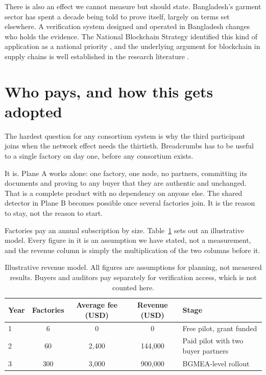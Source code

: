 \documentclass[11pt,a4paper]{article}
\begin{document}
There is also an effect we cannot measure but should state. Bangladesh's garment
sector has spent a decade being told to prove itself, largely on terms set
elsewhere. A verification system designed and operated in Bangladesh changes who
holds the evidence. The National Blockchain Strategy identified this kind of
application as a national priority \citep{ictd2020blockchain}, and the
underlying argument for blockchain in supply chains is well established in the
research literature \citep{saberi2019blockchain,kshetri2018blockchain}.

\section{Who pays, and how this gets adopted}

The hardest question for any consortium system is why the third participant
joins when the network effect needs the thirtieth. Breadcrumbs has to be useful
to a single factory on day one, before any consortium exists.

It is. Plane A works alone: one factory, one node, no partners, committing its
documents and proving to any buyer that they are authentic and unchanged. That
is a complete product with no dependency on anyone else. The shared detector in
Plane B becomes possible once several factories join. It is the reason to stay,
not the reason to start.

Factories pay an annual subscription by size. Table~\ref{tab:money} sets out an
illustrative model. Every figure in it is an assumption we have stated, not a
measurement, and the revenue column is simply the multiplication of the two
columns before it.

\begin{table}[htbp]
\centering
\caption{Illustrative revenue model. All figures are assumptions for planning,
not measured results. Buyers and auditors pay separately for verification
access, which is not counted here.}
\label{tab:money}
\small
\begin{tabular}{@{}l c c c l@{}}
\toprule
\textbf{Year} & \textbf{Factories} & \textbf{Average fee (USD)} &
\textbf{Revenue (USD)} & \textbf{Stage} \\
\midrule
1 & 6   & 0     & 0       & Free pilot, grant funded \\
2 & 60  & 2{,}400 & 144{,}000 & Paid pilot with two buyer partners \\
3 & 300 & 3{,}000 & 900{,}000 & BGMEA-level rollout \\
\bottomrule
\end{tabular}
\end{table}
\end{document}
